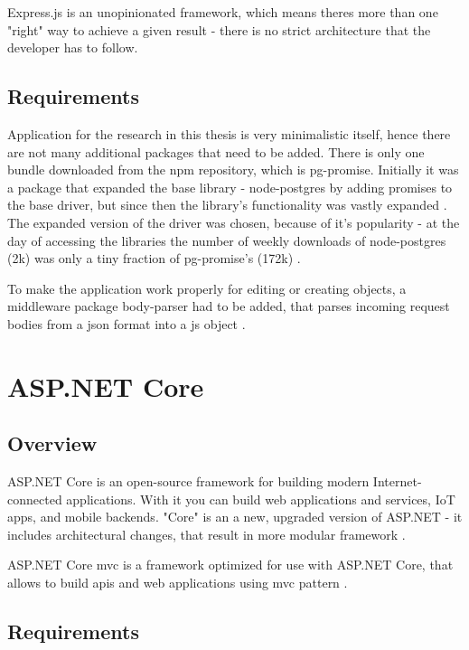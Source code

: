 Express.js is an unopinionated framework, which means theres more than one "right" way to achieve a given result - there is no strict architecture that the developer has to follow.

\subsection{Requirements}
Application for the research in this thesis is very minimalistic itself, hence there are not many additional packages that need to be added. There is only one bundle downloaded from the \acrshort{npm} repository, which is pg-promise. Initially it was a package that expanded the base library - node-postgres by adding promises to the base driver, but since then the library's functionality was vastly expanded \cite{pgPromiseGit}.
The expanded version of the driver was chosen, because of it's popularity - at the day of accessing the libraries the number of weekly downloads of node-postgres (2k) \cite{nodePostgresNpm} was only a tiny fraction of pg-promise's (172k) \cite{pgPromiseNpm}.

To make the application work properly for editing or creating objects, a middleware package body-parser had to be added, that parses incoming request bodies from a json format into a \acrshort{js} object \cite{bodyParser}.

\section{ASP.NET Core}

\subsection{Overview}
ASP.NET Core is an open-source framework for building modern Internet-connected applications. With it you can build web applications and services, IoT apps, and mobile backends. "Core" is an a new, upgraded version of ASP.NET - it includes architectural changes, that result in more modular framework \cite{aspnetIntroduction}.

ASP.NET Core \acrshort{mvc} is a framework optimized for use with ASP.NET Core, that allows to build \acrshort{api}s and web applications using \acrlong{mvc} pattern \cite{aspnetMvcOverview}.

\subsection{Requirements}

